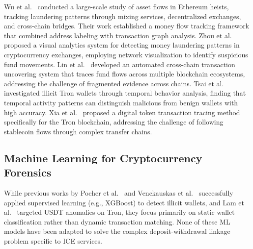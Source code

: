 \documentclass[journal]{IEEEtran}
\begin{document}
    Wu et al.~\cite{wu2023asset} conducted a large-scale study of asset flows in Ethereum heists, tracking laundering patterns through mixing services, decentralized exchanges, and cross-chain bridges. Their work established a money flow tracking framework that combined address labeling with transaction graph analysis. Zhou et al.~\cite{zhou2023visual} proposed a visual analytics system for detecting money laundering patterns in cryptocurrency exchanges, employing network visualization to identify suspicious fund movements. Lin et al.~\cite{lin2025track} developed an automated cross-chain transaction uncovering system that traces fund flows across multiple blockchain ecosystems, addressing the challenge of fragmented evidence across chains. Tsai et al.~\cite{tsai2024tron} investigated illicit Tron wallets through temporal behavior analysis, finding that temporal activity patterns can distinguish malicious from benign wallets with high accuracy. Xia et al.~\cite{xia2024token} proposed a digital token transaction tracing method specifically for the Tron blockchain, addressing the challenge of following stablecoin flows through complex transfer chains.
    
    \subsection{Machine Learning for Cryptocurrency Forensics}
    
    While previous works by Pocher et al.~\cite{pocher2023detecting} and Venckauskas et al.~\cite{venckauskas2024ml} successfully applied supervised learning (e.g., XGBoost) to detect illicit wallets, and Lam et al.~\cite{lam2024usdt} targeted USDT anomalies on Tron, they focus primarily on static wallet classification rather than dynamic transaction matching. None of these ML models have been adapted to solve the complex deposit-withdrawal linkage problem specific to ICE services.
    
\end{document}

